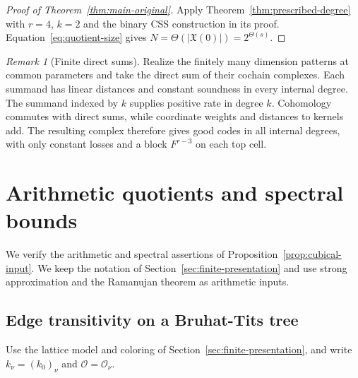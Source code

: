 \documentclass[11pt,letterpaper]{article}
\theoremstyle{definition}
\theoremstyle{remark}
\newtheorem{remark}[theorem]{Remark}
\newcommand{\X}{\mathfrak{X}}
\begin{document}
\begin{proof}[Proof of Theorem~\ref{thm:main-original}]
Apply Theorem~\ref{thm:prescribed-degree} with $r=4$, $k=2$ and
the binary CSS construction in its proof.
Equation~\eqref{eq:quotient-size} gives
$N=\Theta(|\X(0)|)=2^{\Theta(s)}$.
\end{proof}

\begin{remark}[Finite direct sums]
\label{rem:all-degrees}
Realize the finitely many dimension patterns at common parameters
and take the direct sum of their cochain complexes.
Each summand has linear distances and
constant soundness in every internal degree. The summand indexed
by $k$ supplies positive rate in degree $k$. Cohomology commutes
with direct sums, while coordinate weights and distances to kernels
add. The resulting complex therefore gives good codes in all internal
degrees, with only constant losses and a block $F^{r-3}$ on each top cell.
\end{remark}

\appendix

\section{Arithmetic quotients and spectral bounds}
\label{sec:arithmetic}
We verify the arithmetic and spectral assertions of Proposition~\ref{prop:cubical-input}.
We keep the notation of Section~\ref{sec:finite-presentation} and
use strong approximation and the Ramanujan theorem as arithmetic inputs.

\subsection{Edge transitivity on a Bruhat-Tits tree}
\label{sec:tree-edge-transitivity}

Use the lattice model and coloring of
Section~\ref{sec:finite-presentation}, and write
$k_\nu=(k_0)_\nu$ and $\mathcal O=\mathcal O_\nu$.
\end{document}
